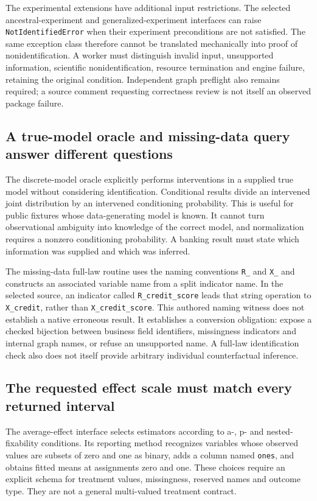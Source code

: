 The experimental extensions have additional input restrictions. The
selected ancestral-experiment and generalized-experiment interfaces can
raise \texttt{NotIdentifiedError} when their experiment preconditions are
not satisfied. The same exception class therefore cannot be translated
mechanically into proof of nonidentification. A worker must distinguish
invalid input, unsupported information, scientific nonidentification,
resource termination and engine failure, retaining the original condition.
Independent graph preflight also remains required; a source comment
requesting correctness review is not itself an observed package failure.
\citep{exec24_ananke_source}

\subsection{A true-model oracle and missing-data query answer different questions}
The discrete-model oracle explicitly performs interventions in a supplied
true model without considering identification. Conditional results divide
an intervened joint distribution by an intervened conditioning probability.
This is useful for public fixtures whose data-generating model is known.
It cannot turn observational ambiguity into knowledge of the correct model,
and normalization requires a nonzero conditioning probability. A banking
result must state which information was supplied and which was inferred.
\citep{exec24_ananke_source,exec24_ananke_choice}

The missing-data full-law routine uses the naming conventions
\texttt{R\_} and \texttt{X\_} and constructs an associated variable name
from a split indicator name. In the selected source, an indicator called
\texttt{R\_credit\_score} leads that string operation to
\texttt{X\_credit}, rather than \texttt{X\_credit\_score}.
This authored naming witness does not establish a native erroneous result.
It establishes a conversion obligation: expose a checked bijection between
business field identifiers, missingness indicators and internal graph
names, or refuse an unsupported name. A full-law identification check
also does not itself provide arbitrary individual counterfactual inference.
\citep{exec24_ananke_source,exec24_ananke_choice}

\subsection{The requested effect scale must match every returned interval}
The average-effect interface selects estimators according to a-, p- and
nested-fixability conditions. Its reporting method recognizes variables
whose observed values are subsets of zero and one as binary, adds a column
named \texttt{ones}, and obtains fitted means at assignments zero and one.
These choices require an explicit schema for treatment values, missingness,
reserved names and outcome type. They are not a general multi-valued
treatment contract.\citep{exec24_ananke_source}

